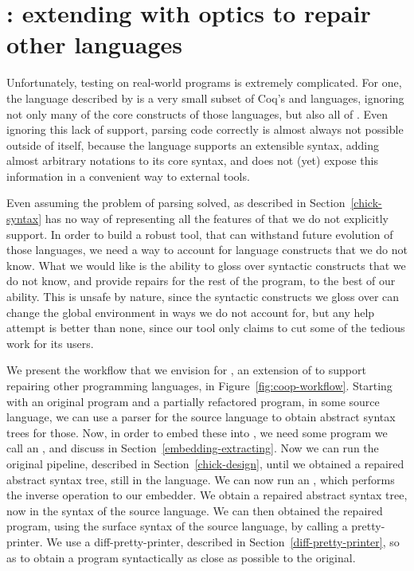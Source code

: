 \section{\Coop{}: extending \Chick{} with optics to repair other languages}

Unfortunately, testing \Chick{} on real-world \Coq{} programs is extremely
complicated.  For one, the language described by \Chick{} is a very small subset
of Coq's \Gallina{} and \Vernacular{} languages, ignoring not only many of the
core constructs of those languages, but also all of \Ltac{}.  Even ignoring this
lack of support, parsing \Coq{} code correctly is almost always not possible
outside of \Coq{} itself, because the language supports an extensible syntax,
adding almost arbitrary notations to its core syntax, and does not (yet) expose
this information in a convenient way to external tools.

Even assuming the problem of parsing solved, \Chick{} as described in
Section~\ref{chick-syntax} has no way of representing all the features of \Coq{}
that we do not explicitly support.  In order to build a robust tool, that can
withstand future evolution of those languages, we need a way to account for
language constructs that we do not know.  What we would like is the ability to
gloss over syntactic constructs that we do not know, and provide repairs for the
rest of the program, to the best of our ability.  This is unsafe by nature,
since the syntactic constructs we gloss over can change the global environment
in ways we do not account for, but any help attempt is better than none, since
our tool only claims to cut some of the tedious work for its users.

We present the workflow that we envision for \Coop{}, an extension of \Chick{}
to support repairing other programming languages, in
Figure~\ref{fig:coop-workflow}.  Starting with an original program and a
partially refactored program, in some source language, we can use a parser for
the source language to obtain abstract syntax trees for those.  Now, in order to
embed these into \Chick{}, we need some program we call an ,
and discuss in Section~\ref{embedding-extracting}.  Now we can run the original
\Chick{} pipeline, described in Section~\ref{chick-design}, until we obtained a
repaired abstract syntax tree, still in the \Chick{} language.  We can now run
an , which performs the inverse operation to our embedder.  We
obtain a repaired abstract syntax tree, now in the syntax of the source
language.  We can then obtained the repaired program, using the surface syntax
of the source language, by calling a pretty-printer.  We use a
diff-pretty-printer, described in Section~\ref{diff-pretty-printer}, so as to
obtain a program syntactically as close as possible to the original.


